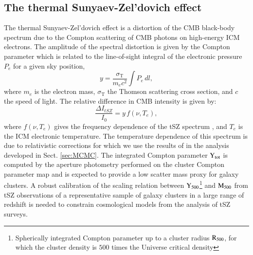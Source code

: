 \documentclass[traditabstract]{aa}
\begin{document}
\subsection{The thermal Sunyaev-Zel'dovich effect}
The thermal Sunyaev-Zel'dovich effect \citep{sun72,sun80} is a distortion of the CMB black-body spectrum due to the Compton scattering of CMB photons on high-energy ICM electrons. The amplitude of the spectral distortion is given by the Compton parameter which is related to the line-of-sight integral of the electronic pressure $P_e$ for a given sky position,
\begin{equation}
        y = \frac{\sigma_{\mathrm{T}}}{m_{e} c^2} \int P_{e} \, dl,
        \label{eq:y_compton}
\end{equation}
where $m_{e}$ is the electron mass, $\sigma_{\mathrm{T}}$ the Thomson scattering cross section, and $c$ the speed of light. The relative difference in CMB intensity is given by:
\begin{equation}
        \frac{\Delta I_{tSZ}}{I_0} = y \, f(\nu, T_e),
\label{eq:deltaI}
\end{equation}
where $f(\nu, T_e)$ gives the frequency dependence of the tSZ spectrum \citep{bir99,car02}, and $T_e$ is the ICM electronic temperature. The temperature dependence of this spectrum is due to relativistic corrections for which we use the results of \cite{ito98,poi98} in the analysis developed in Sect. \ref{sec:MCMC}. The integrated Compton parameter $\rm{Y_{tot}}$ is computed by the aperture photometry performed on the cluster Compton parameter map and is expected to provide a low scatter mass proxy for galaxy clusters. A robust calibration of the scaling relation between $\rm{Y_{500}}$\footnote{Spherically integrated Compton parameter up to a cluster radius $\rm{R_{500}}$, for which the cluster density is $500$ times the Universe critical density} and $\rm{M_{500}}$ from tSZ observations of a representative sample of galaxy clusters in a large range of redshift is needed to constrain cosmological models from the analysis of tSZ surveys.
\end{document}
